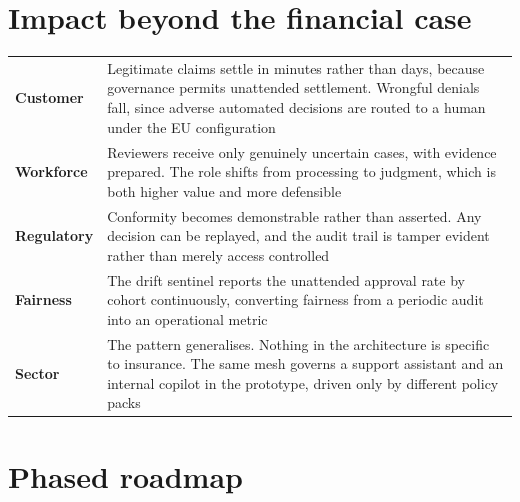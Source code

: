 \documentclass[10pt]{article}
\begin{document}
\section{Impact beyond the financial case}

\vspace{2pt}
{\small
\begin{xltabular}{\textwidth}{@{}L{0.18\textwidth}Y@{}}
\toprule
{} &  \\
\midrule
\textbf{Customer} & Legitimate claims settle in minutes rather than days, because governance permits unattended settlement. Wrongful denials fall, since adverse automated decisions are routed to a human under the EU configuration \\
\textbf{Workforce} & Reviewers receive only genuinely uncertain cases, with evidence prepared. The role shifts from processing to judgment, which is both higher value and more defensible \\
\textbf{Regulatory} & Conformity becomes demonstrable rather than asserted. Any decision can be replayed, and the audit trail is tamper evident rather than merely access controlled \\
\textbf{Fairness} & The drift sentinel reports the unattended approval rate by cohort continuously, converting fairness from a periodic audit into an operational metric \\
\textbf{Sector} & The pattern generalises. Nothing in the architecture is specific to insurance. The same mesh governs a support assistant and an internal copilot in the prototype, driven only by different policy packs \\
\bottomrule
\end{xltabular}}

\section{Phased roadmap}
\end{document}
